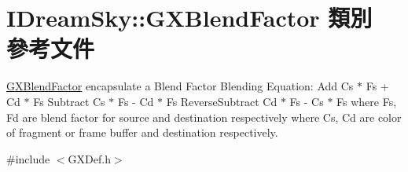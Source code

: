 \hypertarget{class_i_dream_sky_1_1_g_x_blend_factor}{}\section{I\+Dream\+Sky\+:\+:G\+X\+Blend\+Factor 類別 參考文件}
\label{class_i_dream_sky_1_1_g_x_blend_factor}


\hyperlink{class_i_dream_sky_1_1_g_x_blend_factor}{G\+X\+Blend\+Factor} encapsulate a Blend Factor Blending Equation\+: Add Cs $\ast$ Fs + Cd $\ast$ Fs Subtract Cs $\ast$ Fs -\/ Cd $\ast$ Fs Reverse\+Subtract Cd $\ast$ Fs -\/ Cs $\ast$ Fs where Fs, Fd are blend factor for source and destination respectively where Cs, Cd are color of fragment or frame buffer and destination respectively.  




{\ttfamily \#include $<$G\+X\+Def.\+h$>$}

